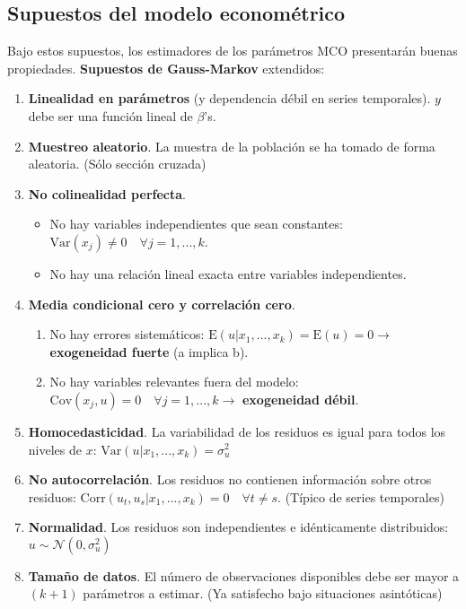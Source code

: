 \documentclass[10pt, a4paper, landscape]{extarticle}
\newcommand{\E}{\mathrm{E}}
\newcommand{\Var}{\mathrm{Var}}
\newcommand{\Cov}{\mathrm{Cov}}
\newcommand{\Corr}{\mathrm{Corr}}
\begin{document}
\begin{multicols}{3}
	\subsection*{Supuestos del modelo econométrico}
		Bajo estos supuestos, los estimadores de los parámetros MCO presentarán buenas propiedades. \textbf{Supuestos de Gauss-Markov} extendidos:
		\begin{enumerate}[leftmargin=*]
			\item \textbf{Linealidad en parámetros} (y dependencia débil en series temporales). $y$ debe ser una función lineal de $\beta$'s.
			\item \textbf{Muestreo aleatorio}. La muestra de la población se ha tomado de forma aleatoria. (Sólo sección cruzada)
			\item \textbf{No colinealidad perfecta}.
			\begin{itemize}[leftmargin=*]
				\item No hay variables independientes que sean constantes: $\Var(x_j) \neq 0 \quad \forall j = 1, ..., k$.
				\item No hay una relación lineal exacta entre variables independientes.
			\end{itemize}
			\item \textbf{Media condicional cero y correlación cero}.
			\begin{enumerate}[leftmargin=*, label=\alph*.]
				\item No hay errores sistemáticos: $\E(u | x_1, ..., x_k) = \E(u) = 0 \rightarrow$ \textbf{exogeneidad fuerte} (a implica b).
				\item No hay variables relevantes fuera del modelo: $\Cov(x_j , u) = 0 \quad \forall j = 1, ..., k \rightarrow$ \textbf{exogeneidad débil}.
			\end{enumerate}
			\item \textbf{Homocedasticidad}. La variabilidad de los residuos es igual para todos los niveles de $x$: $\Var(u | x_1, ..., x_k) = \sigma^2_u$
			\item \textbf{No autocorrelación}. Los residuos no contienen información sobre otros residuos: $\Corr(u_t, u_s | x_1, ..., x_k) = 0 \quad \forall t \neq s$. (Típico de series temporales)
			\item \textbf{Normalidad}. Los residuos son independientes e idénticamente distribuidos: $u \sim \mathcal{N}(0,\sigma^2_u)$
			\item \textbf{Tamaño de datos}. El número de observaciones disponibles debe ser mayor a $(k + 1)$ parámetros a estimar. (Ya satisfecho bajo situaciones asintóticas)
		\end{enumerate}

\end{multicols}
\end{document}
